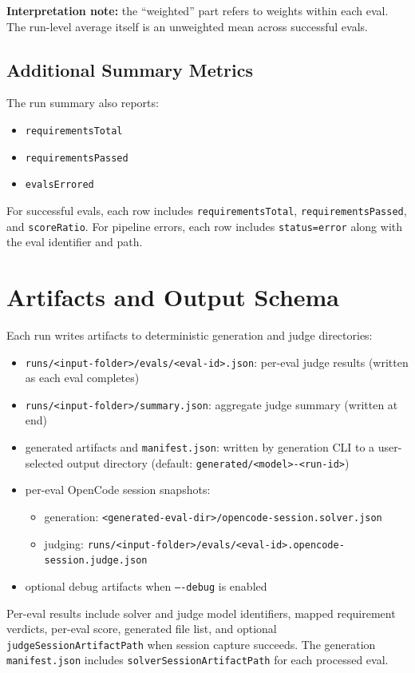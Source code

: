 \documentclass[11pt]{article}
\begin{document}
\textbf{Interpretation note:} the ``weighted'' part refers to weights within each eval. The run-level average itself is an unweighted mean across successful evals.

\subsection{Additional Summary Metrics}
The run summary also reports:
\begin{itemize}
  \item \texttt{requirementsTotal}
  \item \texttt{requirementsPassed}
  \item \texttt{evalsErrored}
\end{itemize}

For successful evals, each row includes \texttt{requirementsTotal}, \texttt{requirementsPassed},
and \texttt{scoreRatio}. For pipeline errors, each row includes \texttt{status=error}
along with the eval identifier and path.

\section{Artifacts and Output Schema}
Each run writes artifacts to deterministic generation and judge directories:
\begin{itemize}
  \item \texttt{runs/<input-folder>/evals/<eval-id>.json}: per-eval judge results (written as each eval completes)
  \item \texttt{runs/<input-folder>/summary.json}: aggregate judge summary (written at end)
  \item generated artifacts and \texttt{manifest.json}: written by generation CLI to a user-selected output directory (default: \texttt{generated/<model>-<run-id>})
  \item per-eval OpenCode session snapshots:
  \begin{itemize}
    \item generation: \texttt{<generated-eval-dir>/opencode-session.solver.json}
    \item judging: \texttt{runs/<input-folder>/evals/<eval-id>.opencode-session.judge.json}
  \end{itemize}
  \item optional debug artifacts when \texttt{----debug} is enabled
\end{itemize}

Per-eval results include solver and judge model identifiers, mapped requirement verdicts, per-eval score, generated file list, and optional \texttt{judgeSessionArtifactPath} when session capture succeeds. The generation \texttt{manifest.json} includes \texttt{solverSessionArtifactPath} for each processed eval.
\end{document}

